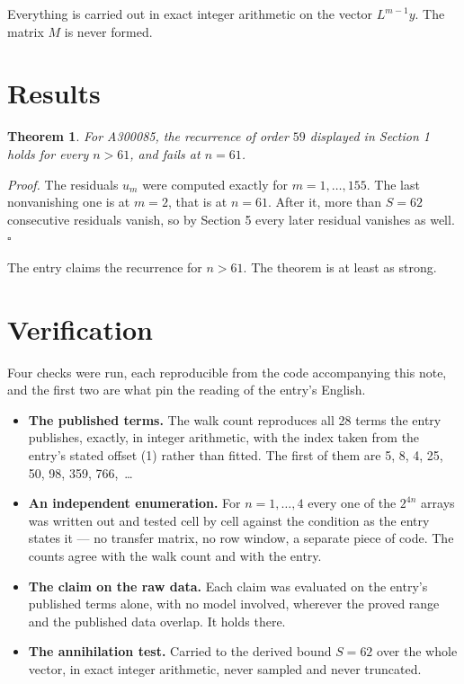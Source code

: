 \documentclass[11pt]{article}
\newtheorem{theorem}{Theorem}
\theoremstyle{definition}
\begin{document}
Everything is carried out in exact integer arithmetic on the vector $L^{m-1}y$. The matrix $M$ is never formed.

\section{Results}

\begin{theorem} For A300085, the recurrence of order $59$ displayed in Section 1 holds for every $n > 61$, and fails at $n = 61$.\end{theorem}

{\itshape Proof.} The residuals $u_m$ were computed exactly for $m = 1,\dots,155$. The last nonvanishing one is at $m = 2$, that is at $n = 61$. After it, more than $S = 62$ consecutive residuals vanish, so by Section 5 every later residual vanishes as well. $\square$

The entry claims the recurrence for $n > 61$. The theorem is at least as strong.

\section{Verification}

Four checks were run, each reproducible from the code accompanying this note, and the first two are what pin the reading of the entry's English.

\begin{itemize}

\item {\bfseries The published terms.} The walk count reproduces all 28 terms the entry publishes, exactly, in integer arithmetic, with the index taken from the entry's stated offset (1) rather than fitted. The first of them are 5, 8, 4, 25, 50, 98, 359, 766,~\dots

\item {\bfseries An independent enumeration.} For $n = 1,\dots,4$ every one of the $2^{4n}$ arrays was written out and tested cell by cell against the condition as the entry states it --- no transfer matrix, no row window, a separate piece of code. The counts agree with the walk count and with the entry.

\item {\bfseries The claim on the raw data.} Each claim was evaluated on the entry's published terms alone, with no model involved, wherever the proved range and the published data overlap. It holds there.

\item {\bfseries The annihilation test.} Carried to the derived bound $S = 62$ over the whole vector, in exact integer arithmetic, never sampled and never truncated.

\end{itemize}
\end{document}

